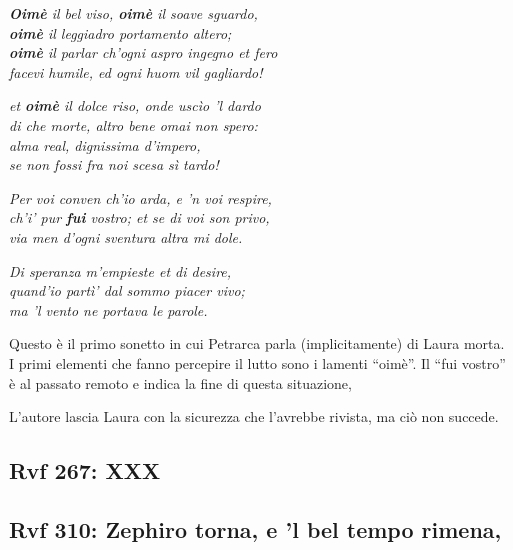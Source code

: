 \documentclass[a4paper]{article}
\newcommand{\quotes}[1]{``#1''}
\begin{document}
\begin{center}
    \textit{\textbf{Oimè} il bel viso, \textbf{oimè} il soave sguardo,} \\
    \textit{\textbf{oimè} il leggiadro portamento altero;} \\
    \textit{\textbf{oimè} il parlar ch'ogni aspro ingegno et fero} \\
    \textit{facevi humile, ed ogni huom vil gagliardo!}
\end{center}
\begin{center}
    \textit{et \textbf{oimè} il dolce riso, onde uscìo 'l dardo} \\
    \textit{di che morte, altro bene omai non spero:} \\
    \textit{alma real, dignissima d'impero,} \\
    \textit{se non fossi fra noi scesa sì tardo!}
\end{center}
\begin{center}
    \textit{Per voi conven ch'io arda, e 'n voi respire,} \\
    \textit{ch'i' pur \textbf{fui} vostro; et se di voi son privo,} \\
    \textit{via men d'ogni sventura altra mi dole.} %
\end{center}
\begin{center}
    \textit{Di speranza m'empieste et di desire,} \\
    \textit{quand'io partì' dal sommo piacer vivo;} \\
    \textit{ma 'l vento ne portava le parole.}
\end{center}

Questo è il primo sonetto in cui Petrarca parla (implicitamente) di Laura morta.
I primi elementi che fanno percepire il lutto sono i lamenti \quotes{oimè}.
Il \quotes{fui vostro} è al passato remoto e indica la fine di questa situazione,

L'autore lascia Laura con la sicurezza che l'avrebbe rivista, ma ciò non succede.

\pagebreak

\subsection{Rvf 267: XXX}

\pagebreak

\subsection{Rvf 310:  Zephiro torna, e 'l bel tempo rimena,}
\end{document}
